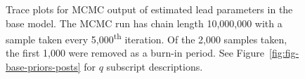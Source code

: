 \documentclass[11pt]{book}
\begin{document}
\begin{figure}[H]

{\centering {} 

}

\caption{Trace plots for MCMC output of estimated lead parameters in the base model. The MCMC run has chain length 10,000,000 with a sample taken every 5,000\textsuperscript{th} iteration. Of the 2,000 samples taken, the first 1,000 were removed as a burn-in period. See Figure~\ref{fig:fig-base-priors-posts} for \(q\) subscript descriptions.}\label{fig:fig-base-trace}
\end{figure}
\end{document}
